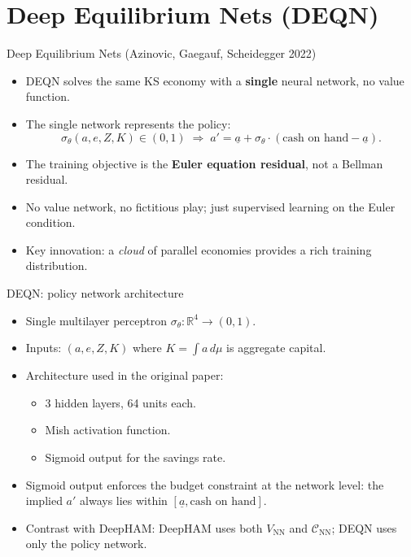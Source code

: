 \documentclass[10pt,english,aspectratio=169]{beamer}
\begin{document}

\section{Deep Equilibrium Nets (DEQN)}

\begin{frame}{Deep Equilibrium Nets (Azinovic, Gaegauf, Scheidegger 2022)}
\begin{itemize}
\item DEQN solves the same KS economy with a \textbf{single} neural network, no value function.
\medskip
\item The single network represents the policy:
\[
\sigma_\theta(a, e, Z, K) \in (0,1)
\;\Rightarrow\;
a' = \underline a + \sigma_\theta\cdot(\text{cash on hand} - \underline a).
\]
\medskip
\item The training objective is the \textbf{Euler equation residual}, not a Bellman residual.
\medskip
\item No value network, no fictitious play; just supervised learning on the Euler condition.
\medskip
\item Key innovation: a \emph{cloud} of parallel economies provides a rich training distribution.
\end{itemize}
\end{frame}

\begin{frame}{DEQN: policy network architecture}
\begin{itemize}
\item Single multilayer perceptron $\sigma_\theta : \mathbb{R}^4 \to (0,1)$.
\medskip
\item Inputs: $(a, e, Z, K)$ where $K = \int a\, d\mu$ is aggregate capital.
\medskip
\item Architecture used in the original paper:
  \begin{itemize}
  \item 3 hidden layers, 64 units each.
  \item Mish activation function.
  \item Sigmoid output for the savings rate.
  \end{itemize}
\medskip
\item Sigmoid output enforces the budget constraint at the network level: the implied $a'$ always lies within $[\underline a, \text{cash on hand}]$.
\medskip
\item Contrast with DeepHAM: DeepHAM uses both $V_{\text{NN}}$ and $\mathcal C_{\text{NN}}$; DEQN uses only the policy network.
\end{itemize}
\end{frame}
\end{document}
